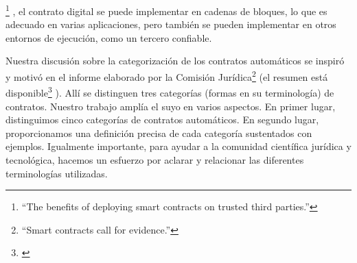 \documentclass[12pt]{report} %
\begin{document}
\begin{itemize}
\footnote{\cite{CarlosMolinaJan2019}“The benefits of deploying smart contracts on trusted third parties.” } , el  contrato digital se puede implementar en cadenas de bloques, lo que es adecuado en varias aplicaciones, pero también se pueden implementar en otros entornos de ejecución, como un tercero confiable. 

Nuestra discusión sobre la categorización de los contratos automáticos se inspiró y motivó en el informe elaborado por la Comisión Jurídica\footnote{\cite{LawCommission2020}“Smart contracts call for evidence.” }  (el resumen está disponible\footnote{\cite{LawCommission2020}} ). Allí se distinguen tres categorías (formas en su terminología) de contratos. Nuestro trabajo amplía el suyo en varios aspectos. En primer lugar, distinguimos cinco categorías de contratos automáticos. En segundo lugar, proporcionamos una definición precisa de cada categoría sustentados con ejemplos. Igualmente importante, para ayudar a la comunidad científica jurídica  y tecnológica, hacemos un esfuerzo por aclarar y relacionar las diferentes terminologías utilizadas.


\end{itemize}
\end{document}
